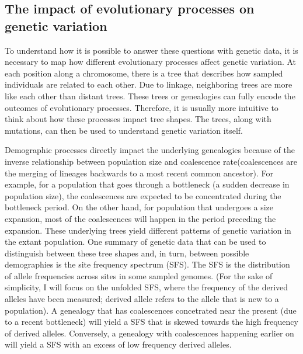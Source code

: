 \subsection{The impact of evolutionary processes on genetic variation}
To understand how it is possible to answer these questions with genetic data,
it is necessary to map how different evolutionary processes affect genetic variation.
At each position along a chromosome, there is a tree that describes how sampled individuals are related to each other.
Due to linkage, neighboring trees are more like each other than distant trees.
These trees or genealogies can fully encode the outcomes of evolutionary processes.
Therefore, it is usually more intuitive to think about how these processes impact tree shapes.
The trees, along with mutations, can then be used to understand genetic variation itself.

Demographic processes directly impact the underlying genealogies because of the inverse relationship between population size and coalescence rate(coalescences are the merging of lineages backwards to a most recent common ancestor).
For example, for a population that goes through a bottleneck (\ie a sudden decrease in population size),
the coalescences are expected to be concentrated during the bottleneck period.
On the other hand, for population that undergoes a size expansion,
most of the coalescences will happen in the period preceding the expansion.
These underlying trees yield different patterns of genetic variation in the extant population.
One summary of genetic data that can be used to distinguish between these tree shapes and, in turn, between possible demographies is the site frequency spectrum (SFS).
The SFS is the distribution of allele frequencies across sites in some sampled genomes.
(For the sake of simplicity, I will focus on the unfolded SFS, where the frequency of the derived alleles have been measured; derived allele refers to the allele that is new to a population).
A genealogy that has coalescences concetrated near the present (due to a recent bottleneck) will yield a SFS that is skewed towards the high frequency of derived alleles.
Conversely, a genealogy with coalescences happening earlier on will yield a SFS with an excess of low frequency derived alleles.

